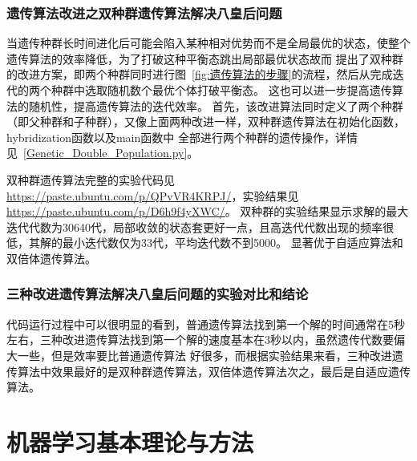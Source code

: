 \documentclass[12pt,a4paper,UTF8]{ctexart}
\begin{document}
\subsubsection{遗传算法改进之双种群遗传算法解决八皇后问题}
当遗传种群长时间进化后可能会陷入某种相对优势而不是全局最优的状态，使整个遗传算法的效率降低，为了打破这种平衡态跳出局部最优状态故而
提出了双种群的改进方案，即两个种群同时进行图~\ref{fig:遗传算法的步骤}的流程，然后从完成迭代的两个种群中选取随机数个最优个体打破平衡态。
这也可以进一步提高遗传算法的随机性，提高遗传算法的迭代效率。
首先，该改进算法同时定义了两个种群（即父种群和子种群），又像上面两种改进一样，双种群遗传算法在初始化函数，hybridization函数以及main函数中
全部进行两个种群的遗传操作，详情见~\ref{Genetic_Double_Population.py}。

双种群遗传算法完整的实验代码见 \url{https://paste.ubuntu.com/p/QPvVR4KRPJ/}，实验结果见\url{https://paste.ubuntu.com/p/D6h9f4yXWC/}。
双种群的实验结果显示求解的最大迭代代数为30640代，局部收敛的状态套更好一点，且高迭代代数出现的频率很低，其解的最小迭代数仅为33代，平均迭代数不到5000。
显著优于自适应算法和双倍体遗传算法。
\subsubsection{三种改进遗传算法解决八皇后问题的实验对比和结论}
代码运行过程中可以很明显的看到，普通遗传算法找到第一个解的时间通常在5秒左右，三种改进遗传算法找到第一个解的速度基本在3秒以内，虽然遗传代数要偏大一些，但是效率要比普通遗传算法
好很多，而根据实验结果来看，三种改进遗传算法中效果最好的是双种群遗传算法，双倍体遗传算法次之，最后是自适应遗传算法。
\section{机器学习基本理论与方法}
\end{document}
